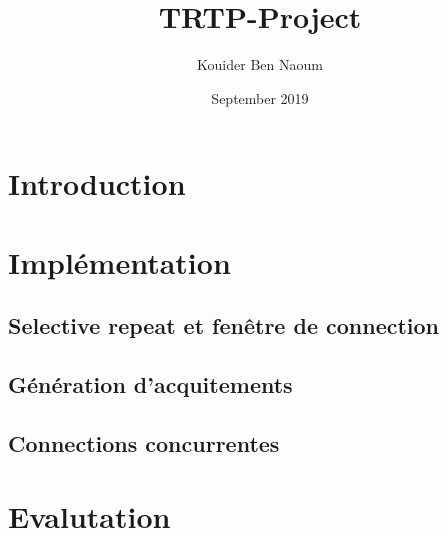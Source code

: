 \documentclass{article}
\title{TRTP-Project}
\author{Kouider Ben Naoum}
\date{September 2019}
\begin{document}
\maketitle




\section{Introduction}
\section{Implémentation}
\subsection{Selective repeat et fenêtre de connection}

\subsection{Génération d'acquitements}

\subsection{Connections concurrentes}

\section{Evalutation}
\end{document}
